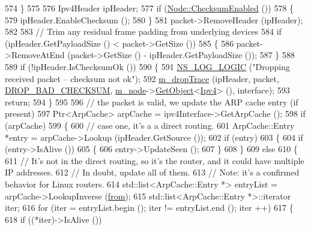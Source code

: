 \begin{DoxyCode}
574     \}
575 
576   Ipv4Header ipHeader;
577   \textcolor{keywordflow}{if} (\hyperlink{classns3_1_1Node_a0515bfe9a3aeb6605d657ba855699815}{Node::ChecksumEnabled} ())
578     \{
579       ipHeader.EnableChecksum ();
580     \}
581   packet->RemoveHeader (ipHeader);
582 
583   \textcolor{comment}{// Trim any residual frame padding from underlying devices}
584   \textcolor{keywordflow}{if} (ipHeader.GetPayloadSize () < packet->GetSize ())
585     \{
586       packet->RemoveAtEnd (packet->GetSize () - ipHeader.GetPayloadSize ());
587     \}
588 
589   \textcolor{keywordflow}{if} (!ipHeader.IsChecksumOk ()) 
590     \{
591       \hyperlink{group__logging_ga88acd260151caf2db9c0fc84997f45ce}{NS\_LOG\_LOGIC} (\textcolor{stringliteral}{"Dropping received packet -- checksum not ok"});
592       \hyperlink{classns3_1_1Ipv4L3Protocol_a80984e2de6a2562b04195b975014cb1b}{m\_dropTrace} (ipHeader, packet, \hyperlink{classns3_1_1Ipv4L3Protocol_a05e7403d60c79529257c4cffdd994da1a14938788d12f864657e5a3aa5d3e26fd}{DROP\_BAD\_CHECKSUM}, 
      \hyperlink{classns3_1_1Ipv4L3Protocol_ad2cc5076c247724f1e99b398edc1965a}{m\_node}->\hyperlink{classns3_1_1Object_a13e18c00017096c8381eb651d5bd0783}{GetObject}<\hyperlink{classns3_1_1Ipv4_a1c15284fe630c76e0c9c75a97f1ff234}{Ipv4}> (), interface);
593       \textcolor{keywordflow}{return};
594     \}
595 
596   \textcolor{comment}{// the packet is valid, we update the ARP cache entry (if present)}
597   Ptr<ArpCache> arpCache = ipv4Interface->GetArpCache ();
598   \textcolor{keywordflow}{if} (arpCache)
599     \{
600       \textcolor{comment}{// case one, it's a a direct routing.}
601       ArpCache::Entry *entry = arpCache->Lookup (ipHeader.GetSource ());
602       \textcolor{keywordflow}{if} (entry)
603         \{
604           \textcolor{keywordflow}{if} (entry->IsAlive ())
605             \{
606               entry->UpdateSeen ();
607             \}
608         \}
609       \textcolor{keywordflow}{else}
610         \{
611           \textcolor{comment}{// It's not in the direct routing, so it's the router, and it could have multiple IP addresses.}
612           \textcolor{comment}{// In doubt, update all of them.}
613           \textcolor{comment}{// Note: it's a confirmed behavior for Linux routers.}
614           std::list<ArpCache::Entry *> entryList = arpCache->LookupInverse (\hyperlink{lte__amc_8m_a1b4c81ff74eb1a626b5ade44c81004b3}{from});
615           std::list<ArpCache::Entry *>::iterator iter;
616           \textcolor{keywordflow}{for} (iter = entryList.begin (); iter != entryList.end (); iter ++)
617             \{
618               \textcolor{keywordflow}{if} ((*iter)->IsAlive ())

\end{DoxyCode}
